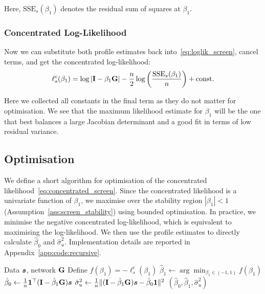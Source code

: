 Here, $\text{SSE}_s(\beta_1)$ denotes the residual sum of squares at $\beta_1$.

\subsubsection{Concentrated Log-Likelihood}

Now we can substitute both profile estimates back into~\eqref{eq:loglik_screen}, cancel terms, and get the concentrated log-likelihood:
\begin{equation}
\label{eq:concentrated_screen}
    \ell_s^c(\beta_1) = \log|\mathbf{I} - \beta_1\mathbf{G}|
    - \frac{n}{2}\log\left(\frac{\text{SSE}_s(\beta_1)}{n}\right) + \text{const.}
\end{equation}

Here we collected all constants in the final term as they do not matter for optimisation. We see that the maximum likelihood estimate for $\beta_1$ will be the one that best balances a large Jacobian determinant and a good fit in terms of low residual variance.

\subsection{Optimisation}

We define a short algorithm for optimisation of the concentrated likelihood~\eqref{eq:concentrated_screen}. Since the concentrated likelihood is a univariate function of $\beta_1$, we maximise over the stability region $|\beta_1| < 1$ (Assumption~\ref{ass:screen_stability}) using bounded optimisation. In practice, we minimise the negative concentrated log-likelihood, which is equivalent to maximising the log-likelihood. We then use the profile estimates to directly calculate $\hat\beta_0$ and $\hat\sigma_u^2$. Implementation details are reported in Appendix~\ref{app:code:recursive}.

\begin{algorithm}[H]
\caption[ML Estimation of SMU Equation]{ML Estimation of SMU Equation.}
\label{alg:screen_ml}
\begin{algorithmic}[1]
\Require Data $\bm{s}$, network $\mathbf{G}$
\State Define $f(\beta_1) = -\ell_s^c(\beta_1)$ 
\State $\hat\beta_1 \gets \arg\min_{\beta_1 \in (-1, 1)} f(\beta_1)$ 
\State $\hat\beta_0 \gets \frac{1}{n}\bm{1}^\top(\mathbf{I} - \hat\beta_1\mathbf{G})\bm{s}$
\State $\hat\sigma_u^2 \gets \frac{1}{n}\|(\mathbf{I} - \hat\beta_1\mathbf{G})\bm{s} - \hat\beta_0\bm{1}\|^2$
\State \Return $(\hat\beta_0, \hat\beta_1, \hat\sigma_u^2)$
\end{algorithmic}
\end{algorithm}

